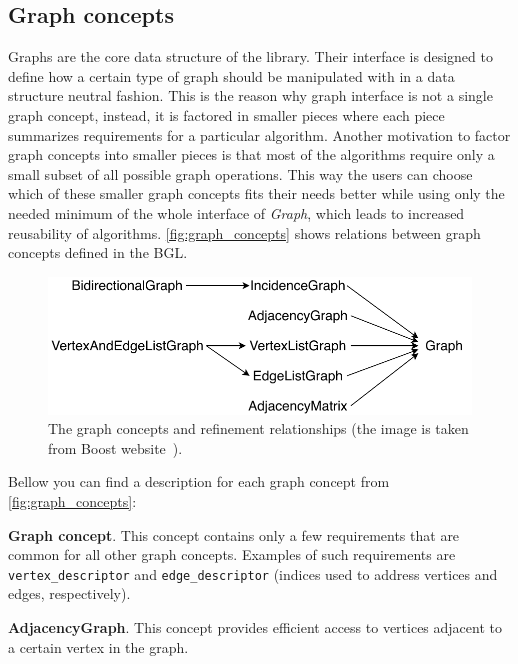 \documentclass[thesis=B,english]{FITthesis}[2019/03/21]
\begin{document}
\subsection{Graph concepts} \label{ssec:graph_concepts}
Graphs are the core data structure of the library. Their interface is designed to define how a certain type of graph should be manipulated with in a data structure neutral fashion. This is the reason why graph interface is not a single graph concept, instead, it is factored in smaller pieces where each piece summarizes requirements for a particular algorithm. Another motivation to factor graph concepts into smaller pieces is that most of the algorithms require only a small subset of all possible graph operations. This way the users can choose which of these smaller graph concepts fits their needs better while using only the needed minimum of the whole interface of \emph{Graph}, which leads to increased reusability of algorithms. \autoref{fig:graph_concepts} shows relations between graph concepts defined in the BGL.

\begin{figure}[H]
	\centering
 	\includegraphics[width=1\textwidth]{img/graph-concepts.pdf}
 	\caption[The graph concepts and refinement relationships]{The graph concepts and refinement relationships (the image is taken from Boost website~\cite{graph_concepts}).}
 	\label{fig:graph_concepts}
\end{figure}

Bellow you can find a description for each graph concept from  \autoref{fig:graph_concepts}:\bigskip

\noindent\textbf{Graph concept}. This concept contains only a few requirements that are common for all other graph concepts. Examples of such requirements are \texttt{vertex\_descriptor} and \texttt{edge\_descriptor} (indices used to address vertices and edges, respectively).\bigskip

\noindent\textbf{AdjacencyGraph}. This concept provides efficient access to vertices adjacent to a certain vertex in the graph.\bigskip
\end{document}
